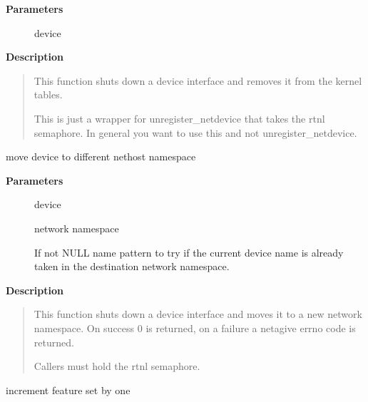 \documentclass[a4paper,8pt,english]{sphinxmanual}
\begin{document}
\textbf{Parameters}
\begin{description}
\item[{}] \leavevmode
device

\end{description}

\textbf{Description}
\begin{quote}

This function shuts down a device interface and removes it
from the kernel tables.

This is just a wrapper for unregister\_netdevice that takes
the rtnl semaphore.  In general you want to use this and not
unregister\_netdevice.
\end{quote}

\begin{fulllineitems}
\label{networking/kapi:c.dev_change_net_namespace}
move device to different nethost namespace

\end{fulllineitems}


\textbf{Parameters}
\begin{description}
\item[{}] \leavevmode
device

\item[{}] \leavevmode
network namespace

\item[{}] \leavevmode
If not NULL name pattern to try if the current device name
is already taken in the destination network namespace.

\end{description}

\textbf{Description}
\begin{quote}

This function shuts down a device interface and moves it
to a new network namespace. On success 0 is returned, on
a failure a netagive errno code is returned.

Callers must hold the rtnl semaphore.
\end{quote}

\begin{fulllineitems}
\label{networking/kapi:c.netdev_increment_features}
increment feature set by one

\end{fulllineitems}
\end{document}

